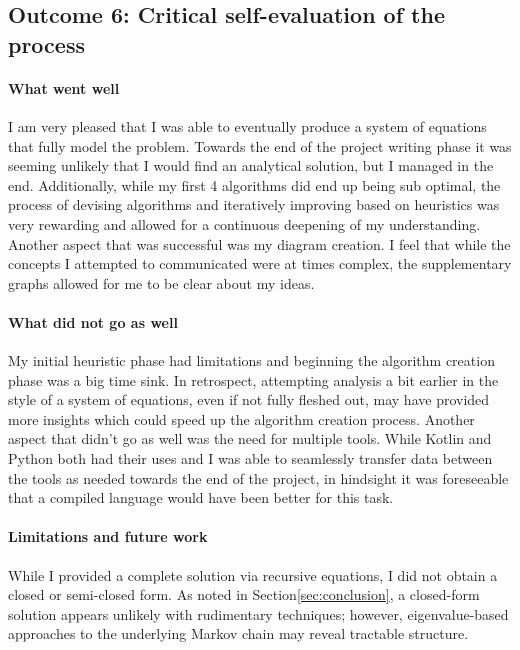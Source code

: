 \documentclass[a4paper,11pt]{article}
\begin{document}
\subsection*{Outcome 6: Critical self-evaluation of the process}

\paragraph{What went well}
I am very pleased that I was able to eventually produce a system of equations that fully model the problem. Towards the end of the project writing phase it was seeming unlikely that I would find an analytical solution, but I managed in the end. Additionally, while my first 4 algorithms did end up being sub optimal, the process of devising algorithms and iteratively improving based on heuristics was very rewarding and allowed for a continuous deepening of my understanding. Another aspect that was successful was my diagram creation. I feel that while the concepts I attempted to communicated were at times complex, the supplementary graphs allowed for me to be clear about my ideas.

\paragraph{What did not go as well}
My initial heuristic phase had limitations and beginning the algorithm creation phase was a big time sink. In retrospect, attempting analysis a bit earlier in the style of a system of equations, even if not fully fleshed out, may have provided more insights which could speed up the algorithm creation process. Another aspect that didn't go as well was the need for multiple tools. While Kotlin and Python both had their uses and I was able to seamlessly transfer data between the tools as needed towards the end of the project, in hindsight it was foreseeable that a compiled language would have been better for this task. 


\paragraph{Limitations and future work}
While I provided a complete solution via recursive equations, I did not obtain a closed or semi-closed form. As noted in Section\ref{sec:conclusion}, a closed-form solution appears unlikely with rudimentary techniques; however, eigenvalue-based approaches to the underlying Markov chain may reveal tractable structure.
\end{document}
